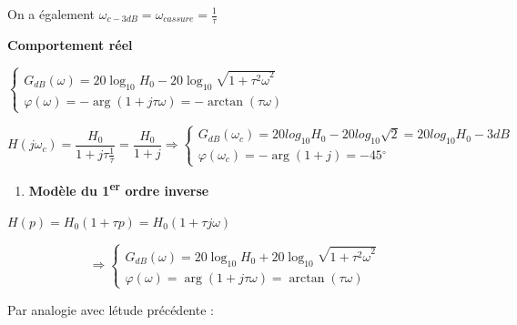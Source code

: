 On a également \(\omega_{c - 3dB} = \omega_{cassure} = \frac{1}{\tau}\)

\textbf{Comportement réel}

\(\left\{ \begin{array}{r}
G_{dB}(\omega) = 20\log_{10}H_{0} - 20\log_{10}\sqrt{1 + {\tau^{2}\omega}^{2}} \\
\varphi(\omega) = - \arg(1 + j\tau\omega) = - \arctan(\tau\omega)
\end{array} \right.\ \)

\[H\left( j\omega_{c} \right) = \frac{H_{0}}{1 + j\tau\frac{1}{\tau}} = \frac{H_{0}}{1 + j} \Longrightarrow \left\{ \begin{array}{r}
G_{dB}\left( \omega_{c} \right) = 20{log_{10}}H_{0} - 20{log_{10}}\sqrt{2} = 20{log_{10}}H_{0} - 3dB \\
\varphi\left( \omega_{c} \right) = - \arg(1 + j) = - 45{^\circ}
\end{array} \right.\ \]

\begin{enumerate}
\def\labelenumi{\arabic{enumi}.}
\setcounter{enumi}{5}
\item
  \protect\hypertarget{_Toc494227268}{}{}\textbf{Modèle du 1\textsuperscript{er} ordre inverse}
\end{enumerate}

\(H(p) = H_{0}(1 + \tau p) = H_{0}(1 + \tau j\omega)\)

\[\mathbf{\Longrightarrow}\left\{ \begin{array}{r}
G_{dB}(\omega) = 20\log_{10}H_{0} + 20\log_{10}\sqrt{1 + {\tau^{2}\omega}^{2}} \\
\varphi(\omega) = \arg(1 + j\tau\omega) = \arctan(\tau\omega)
\end{array} \right.\ \]

Par analogie avec l\textquotesingle étude précédente :

